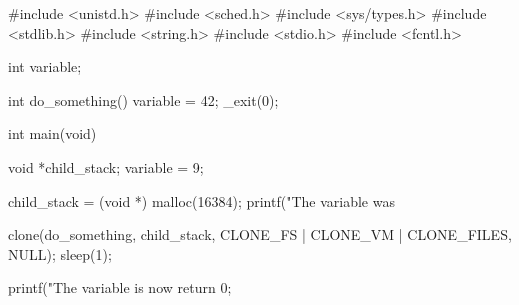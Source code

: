 \documentclass{article}
\begin{document}
\thispagestyle{empty}
\begin{ccode}
#include <unistd.h> 
#include <sched.h> 
#include <sys/types.h> 
#include <stdlib.h> 
#include <string.h> 
#include <stdio.h> 
#include <fcntl.h>
 
int variable;
 
int do_something()
{
  variable = 42;
  _exit(0);
}

int main(void)
{
  void *child_stack;
  variable = 9;

  child_stack = (void *) malloc(16384);
  printf("The variable was %
   
  clone(do_something, child_stack,
        CLONE_FS | CLONE_VM | CLONE_FILES, NULL);
  sleep(1);
 
  printf("The variable is now %
  return 0;
}
\end{ccode}
\end{document}

